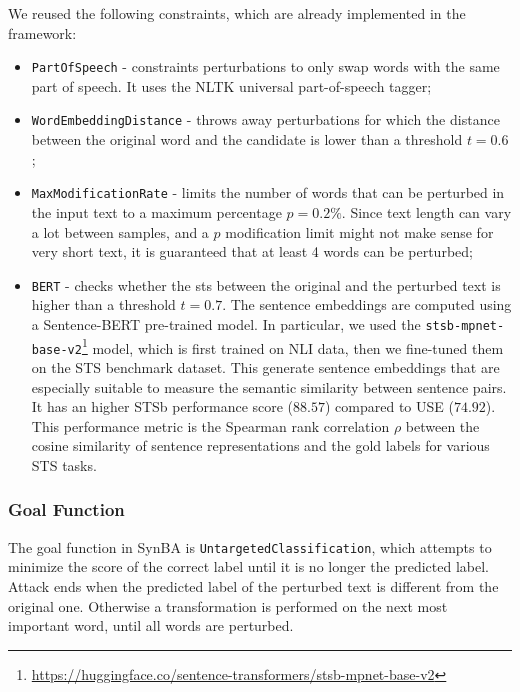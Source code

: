 We reused the following constraints, which are already implemented in the framework:
\begin{itemize}
    \item \texttt{PartOfSpeech} - constraints perturbations to only swap words with the same part of speech. It uses the NLTK universal part-of-speech tagger;
    \item \texttt{WordEmbeddingDistance} - throws away perturbations for which the distance between the original word and the candidate is lower than a threshold $t=0.6$;
    \item \texttt{MaxModificationRate} - limits the number of words that can be perturbed in the input text to a maximum percentage $p=0.2\%$. Since text length can vary a lot between samples, and a $p$ modification limit might not make sense for very short text, it is guaranteed that at least 4 words can be perturbed;
    \item \texttt{BERT} - checks whether the \acrfull{sts} between the original and the perturbed text is higher than a threshold $t=0.7$. The  sentence embeddings are computed using a Sentence-BERT \cite{reimers2019sentencebert} pre-trained model. In particular, we used the \texttt{stsb-mpnet-base-v2}\footnote{\url{https://huggingface.co/sentence-transformers/stsb-mpnet-base-v2}} model, which is first trained on NLI data, then we fine-tuned them on the STS benchmark dataset. This generate sentence embeddings that are especially suitable to measure the semantic similarity between sentence pairs.
    It has an higher STSb performance score ($88.57$) compared to USE ($74.92$). This performance metric is the Spearman rank correlation $\rho$ between the cosine similarity of sentence representations and the gold labels for various STS tasks.
\end{itemize}           

\subsubsection{Goal Function}\label{subsubsec:goal-function}

The goal function in SynBA is \texttt{UntargetedClassification}, which attempts to minimize the score of the correct label until it is no longer the predicted label.
Attack ends when the predicted label of the perturbed text is different from the original one.
Otherwise a transformation is performed on the next most important word, until all words are perturbed.

